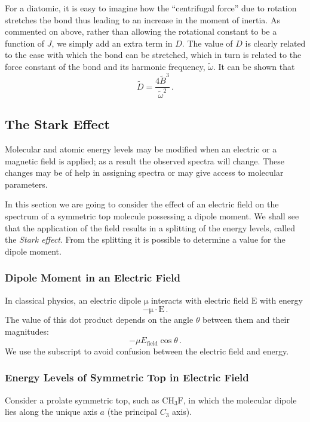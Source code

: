 \documentclass{article}
\theoremstyle{plain}\theoremheaderfont{\normalfont\itshape}\theorembodyfont{\rmfamily}\theoremseparator{.}\newtheorem*{rem}{Remark}\newtheorem*{ex}{Example}\newtheorem*{proof}{Proof}\newtheorem*{altp}{Alternative proof}
\theoremstyle{plain}\theoremheaderfont{\normalfont\bfseries}\theorembodyfont{\rmfamily}\theoremseparator{.}\newtheorem{thm}{Theorem}[section]\newtheorem{lem}[thm]{Lemma}\newtheorem{prop}[thm]{Proposition}\newtheorem*{cor}{Corollary}\newtheorem{defn}[thm]{Definition}\newtheorem{clm}[thm]{Claim}\newtheorem{clminproof}{Claim}\newtheorem{pos}{Postulate}[section]
\theoremstyle{break}\theoremheaderfont{\normalfont\itshape}\theorembodyfont{\rmfamily}\theoremseparator{.\medskip}\newtheorem*{proofskip}{Proof}\newtheorem*{exs}{Examples}\newtheorem*{rems}{Remarks}
\theoremstyle{break}\theoremheaderfont{\normalfont\bfseries}\theorembodyfont{\rmfamily}\theoremseparator{.\medskip}\newtheorem{lemskip}[thm]{Lemma}\newtheorem{defnskip}[thm]{Definition}\newtheorem{propskip}[thm]{Proposition}\newtheorem{thmskip}[thm]{Theorem}
\numberwithin{equation}{section}
\newcommand{\vb}[1]{\bm{\mathrm{#1}}}
\newcommand{\vdot}{\,\bm{\mathrm{\cdot}}\,}
\begin{document}
    For a diatomic, it is easy to imagine how the ``centrifugal force'' due to rotation stretches the bond thus leading to an increase in the moment of inertia. As commented on above, rather than allowing the rotational constant to be a function of \(J\), we simply add an extra term in \(D\). The value of \(D\) is clearly related to the ease with which the bond can be stretched, which in turn is related to the force constant of the bond and its harmonic frequency, \(\tilde{\omega}\). It can be shown that
    \begin{equation}
        \tilde{D}=\frac{4\tilde{B}^3}{\tilde{\omega}^2}\,.
    \end{equation}
    \subsection{The Stark Effect}
    Molecular and atomic energy levels may be modified when an electric or a magnetic field is applied; as a result the observed spectra will change. These changes may be of help in assigning spectra or may give access to molecular parameters.

    In this section we are going to consider the effect of an electric field on the spectrum of a symmetric top molecule possessing a dipole moment. We shall see that the application of the field results in a splitting of the energy levels, called the \textit{Stark effect}. From the splitting it is possible to determine a value for the dipole moment.
    \subsubsection{Dipole Moment in an Electric Field}
    In classical physics, an electric dipole \(\vb{\mu}\) interacts with electric field \(\vb{E}\) with energy
    \begin{equation}
        -\vb{\mu}\vdot\vb{E}\,.
    \end{equation}
    The value of this dot product depends on the angle \(\theta\) between them and their magnitudes:
    \begin{equation}
        -\mu E_{\text{field}}\cos\theta\,.
    \end{equation}
    We use the subscript to avoid confusion between the electric field and energy.

    \subsubsection{Energy Levels of Symmetric Top in Electric Field}
    Consider a prolate symmetric top, such as \(\mathrm{CH_3F}\), in which the molecular dipole lies along the unique axis \(a\) (the principal \(C_3\) axis).
\end{document}
